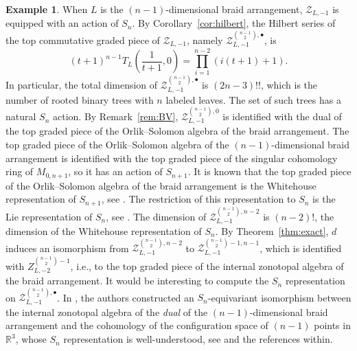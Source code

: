 \documentclass{amsart}
\theoremstyle{definition}
\newtheorem{example}[theorem]{Example}
\begin{document}
\begin{example}\label{ex:braid}
When $L$ is the $(n-1)$-dimensional braid arrangement, $\mathcal{Z}_{L, -1}$ is equipped with an action of $S_n$. By Corollary~\ref{cor:hilbert}, the Hilbert series of the top commutative graded piece of $\mathcal{Z}_{L, -1}$, namely $\mathcal{Z}^{\binom{n-1}{2}, \bullet}_{L, -1}$, is 
$$(t+1)^{n-1} T_{L}(\frac{1}{t+1}, 0 ) = \prod_{i=1}^{n-2} (i(t+1) + 1).$$
In particular, the total dimension of $\mathcal{Z}^{\binom{n-1}{2}, \bullet}_{L, -1}$ is $(2n-3)!!$, which is the number of rooted binary trees with $n$ labeled leaves. The set of such trees has a natural $S_n$ action.  By Remark~\ref{rem:BV}, $\mathcal{Z}_{L, -1}^{\binom{n-1}{2}, 0}$ is identified with the dual of the top graded piece of the Orlik--Solomon algebra of the braid arrangement. The top graded piece of the Orlik--Solomon algebra of the $(n-1)$-dimensional braid arrangement is identified with the top graded piece of the singular cohomology ring of $M_{0, n+1}$, so it has an action of $S_{n+1}$. It is known that the top graded piece of the Orlik--Solomon algebra of the braid arrangement is the Whitehouse representation of $S_{n+1}$, see \cite{KeelTevelev}. The restriction of this representation to $S_n$ is the Lie representation of $S_n$, see \cite{WhitehouseRep}. 
The dimension of $\mathcal{Z}^{\binom{n-1}{2}, n-2}_{L, -1}$ is $(n-2)!$, the dimension of the Whitehouse representation of $S_n$. 
By Theorem~\ref{thm:exact}, $d$ induces an isomorphism from  $\mathcal{Z}^{\binom{n-1}{2}, n-2}_{L, -1}$ to  $\mathcal{Z}^{\binom{n-1}{2} - 1, n-1}_{L, -1}$, which is identified with $Z^{\binom{n-1}{2}-1}_{L, -2}$, i.e., to the top graded piece of the internal zonotopal algebra of the braid arrangement. 
It would be interesting to compute the $S_n$ representation on $\mathcal{Z}_{L, -1}^{\binom{n-1}{2}, \bullet}$. 
In \cite{GeoZonotopeI}, the authors constructed an $S_n$-equivariant isomorphism between the internal zonotopal algebra of the \emph{dual} of the $(n-1)$-dimensional braid arrangement and the cohomology of the configuration space of $(n-1)$ points in $\mathbb{R}^3$, whose $S_n$ representation is well-understood, see \cite{Pagaria} and the references within. 
\end{example}












\end{document}
